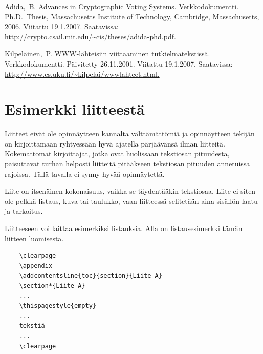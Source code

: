 \documentclass[finnish, 12pt, a4paper, sci, utf8, pdfa]{aaltothesis}
\begin{document}
\begin{thebibliography}{99}
 Adida,\ B.  Advances in Cryptographic Voting Systems.
  Verkkodokumentti. Ph.D.\ Thesis, Massachusetts Institute of
  Technology, Cambridge, 
  \foreignlanguage{english}{Massachusetts,}
  2006. Viitattu 19.1.2007.  Saatavissa:
  \url{http://crypto.csail.mit.edu/~cis/theses/adida-phd.pdf.}

 Kilpeläinen,\ P. WWW-lähteisiin viittaaminen
  tutkielmatekstissä. Verkkodokumentti. Päivitetty 26.11.2001.
  Viitattu 19.1.2007. Saatavissa:
  \url{http://www.cs.uku.fi/~kilpelai/wwwlahteet.html.}

\end{thebibliography}

\clearpage

\thesisappendix

\section{Esimerkki liitteestä\label{LiiteA}}

Liitteet eivät ole opinnäytteen kannalta välttämättömiä ja 
opinnäytteen tekijän on 
kirjoittamaan ryhtyessään hyvä ajatella pärjäävänsä ilman liitteitä.
Kokemattomat kirjoittajat, jotka ovat huolissaan
tekstiosan pituudesta, paisuttavat turhan 
helposti liitteitä pitääkseen tekstiosan pituuden annetuissa rajoissa.
Tällä tavalla ei synny hyvää opinnäytettä.   

Liite on itsenäinen kokonaisuus, vaikka se täydentääkin tekstiosaa.
Liite ei siten ole pelkkä listaus, kuva tai taulukko, vaan 
liitteessä selitetään aina sisällön laatu ja tarkoitus. 

Liitteeseen voi laittaa esimerkiksi listauksia. Alla on 
listausesimerkki tämän liitteen luomisesta. 

\begin{verbatim}
	\clearpage
	\appendix
	\addcontentsline{toc}{section}{Liite A}
	\section*{Liite A}
	...
	\thispagestyle{empty}
	...
	tekstiä
	...
	\clearpage
\end{verbatim}
\end{document}
